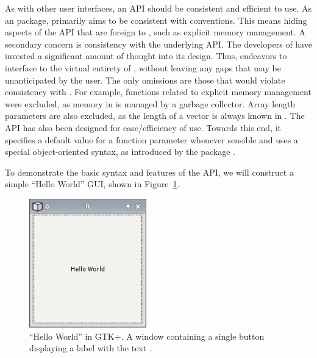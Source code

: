 \documentclass[article,shortnames]{jss}
\begin{document}


As with other user interfaces,
an API should be consistent and efficient to use. As an 
package,
 primarily aims to be consistent with 
conventions. This
means hiding aspects of the  API that are foreign to
,
such as explicit memory management. A secondary concern is consistency 
with the underlying  API. The developers of
 have invested a significant amount of thought into its
design. Thus,
 endeavors to interface  to the virtual
entirety of ,
without leaving any gaps that may be unanticipated by the user. 
The only omissions are those that would violate consistency with
. For example, functions related to explicit memory
management were excluded, as memory in  is managed by a
garbage collector. Array length parameters are also excluded, as the
length of a vector is always known in .
The  API has also been designed for ease/efficiency of use.
Towards this end, it specifies a default value for a function
parameter whenever sensible and uses a special object-oriented syntax,
as introduced by the  package \citep{sjava}.

To demonstrate the basic syntax and features of the  API,
we will construct a simple ``Hello World'' GUI, shown in Figure~\ref{fig:hello-world}.

\begin{figure}[h!tbp]
\begin{center}
\includegraphics[width=2in]{hello-world.png}
\caption{\label{fig:hello-world}``Hello World'' in GTK+. 
A window containing a single button displaying a label with the text
.}
\end{center}
\end{figure}
\end{document}
